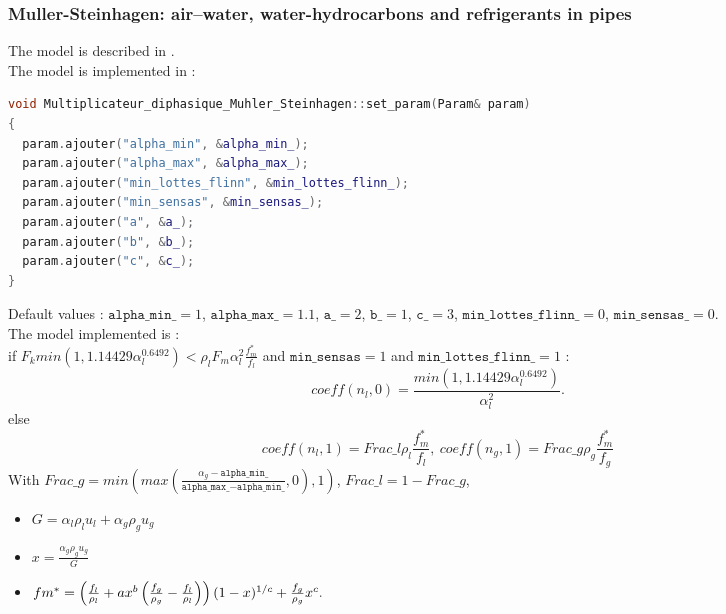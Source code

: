 \subsubsection{Muller-Steinhagen: air–water, water-hydrocarbons and refrigerants in pipes}
The model is described in \textcite{MULLERSTEINHAGEN1986297}.\\
The model is implemented in :
\begin{lstlisting}[language=c++]
void Multiplicateur_diphasique_Muhler_Steinhagen::set_param(Param& param)
{
  param.ajouter("alpha_min", &alpha_min_);
  param.ajouter("alpha_max", &alpha_max_);
  param.ajouter("min_lottes_flinn", &min_lottes_flinn_);
  param.ajouter("min_sensas", &min_sensas_);
  param.ajouter("a", &a_);
  param.ajouter("b", &b_);
  param.ajouter("c", &c_);
}
\end{lstlisting}
Default values : $\texttt{alpha\_min\_} = 1$, $\texttt{alpha\_max\_} = 1.1$, $\texttt{a\_} = 2$, $\texttt{b\_} = 1$, $\texttt{c\_} = 3$, $\texttt{min\_lottes\_flinn\_} = 0$, $\texttt{min\_sensas\_} = 0$.\\
The model implemented is :\\
if $F_k min(1,1.14429\alpha_l^{0.6492}) < \rho_l F_m \alpha_l^2 \frac{f_m^*}{f_l}$ and $\texttt{min\_sensas}=1$ and $\texttt{min\_lottes\_flinn\_}=1$ : 
\begin{equation}
    coeff(n_l, 0) = \frac{min(1,1.14429\alpha_l^{0.6492})}{\alpha_l^2}.
\end{equation}
else 
\begin{equation}
    coeff(n_l, 1) = Frac\_l\rho_l\frac{f_m^*}{f_l},\ coeff(n_g, 1) = Frac\_g\rho_g\frac{f_m^*}{f_g}
\end{equation}
With $Frac\_g=min(max(\frac{\alpha_g-\texttt{alpha\_min\_}}{\texttt{alpha\_max\_}-\texttt{alpha\_min\_}},0),1)$, $Frac\_l=1-Frac\_g$,
\begin{itemize}
    \item[\small \textcolor{blue}{\ding{109}}]$G=\alpha_l\rho_lu_l+\alpha_g\rho_gu_g$
    \item[\small \textcolor{blue}{\ding{109}}]$x=\frac{\alpha_g \rho_gu_g}{G}$
    \item[\small \textcolor{blue}{\ding{109}}]$fm^*=\left( \frac{f_l}{\rho_l}+ax^b\left( \frac{f_g}{\rho_g}-\frac{f_l}{\rho_l} \right) \right)(1-x)^{1/c}+\frac{f_g}{\rho_g}x^c.$
\end{itemize}
